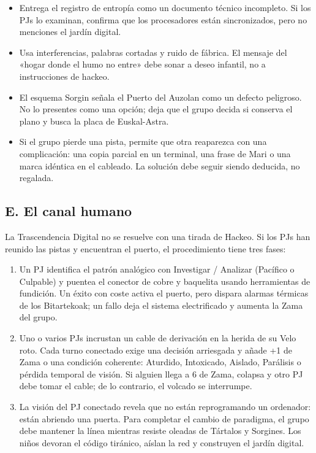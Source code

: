 \begin{itemize}
  \item {} Entrega el registro de entropía como un documento técnico incompleto. Si los PJs lo examinan, confirma que los procesadores están sincronizados, pero no menciones el jardín digital.
  \item {} Usa interferencias, palabras cortadas y ruido de fábrica. El mensaje del «hogar donde el humo no entre» debe sonar a deseo infantil, no a instrucciones de hackeo.
  \item {} El esquema Sorgin señala el Puerto del Auzolan como un defecto peligroso. No lo presentes como una opción; deja que el grupo decida si conserva el plano y busca la placa de Euskal-Astra.
  \item {} Si el grupo pierde una pista, permite que otra reaparezca con una complicación: una copia parcial en un terminal, una frase de Mari o una marca idéntica en el cableado. La solución debe seguir siendo deducida, no regalada.
\end{itemize}

\subsection{E. El canal humano}

La Trascendencia Digital no se resuelve con una tirada de Hackeo. Si los PJs han reunido las pistas y encuentran el puerto, el procedimiento tiene tres fases:

\begin{enumerate}
  \item {} Un PJ identifica el patrón analógico con Investigar / Analizar (Pacífico o Culpable) y puentea el conector de cobre y baquelita usando herramientas de fundición. Un éxito con coste activa el puerto, pero dispara alarmas térmicas de los Bitartekoak; un fallo deja el sistema electrificado y aumenta la Zama del grupo.
  \item {} Uno o varios PJs incrustan un cable de derivación en la herida de su Velo roto. Cada turno conectado exige una decisión arriesgada y añade +1 de Zama o una condición coherente: Aturdido, Intoxicado, Aislado, Parálisis o pérdida temporal de visión. Si alguien llega a 6 de Zama, colapsa y otro PJ debe tomar el cable; de lo contrario, el volcado se interrumpe.
  \item {} La visión del PJ conectado revela que no están reprogramando un ordenador: están abriendo una puerta. Para completar el cambio de paradigma, el grupo debe mantener la línea mientras resiste oleadas de Tártalos y Sorgines. Los niños devoran el código tiránico, aíslan la red y construyen el jardín digital.
\end{enumerate}

